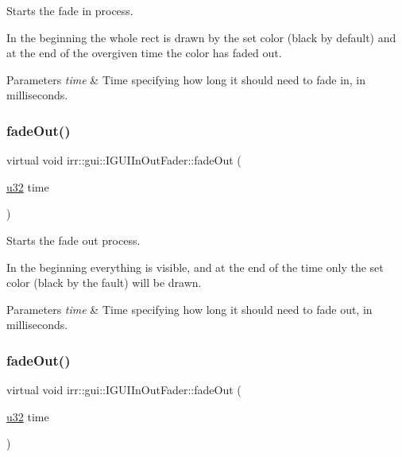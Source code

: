 Starts the fade in process. 

In the beginning the whole rect is drawn by the set color (black by default) and at the end of the overgiven time the color has faded out. 
\begin{DoxyParams}{Parameters}
{\em time} & Time specifying how long it should need to fade in, in milliseconds. \\
\hline
\end{DoxyParams}
\mbox{\label{classirr_1_1gui_1_1IGUIInOutFader_a5006c28699050d73be11b15ffc7ba993}} 
\subsubsection{\texorpdfstring{fade\+Out()}{fadeOut()}\hspace{0.1cm}{\footnotesize\ttfamily [1/2]}}
{\footnotesize\ttfamily virtual void irr\+::gui\+::\+I\+G\+U\+I\+In\+Out\+Fader\+::fade\+Out (\begin{DoxyParamCaption}\item[{\hyperlink{namespaceirr_a0416a53257075833e7002efd0a18e804}{u32}}]{time }\end{DoxyParamCaption})\hspace{0.3cm}{\ttfamily [pure virtual]}}



Starts the fade out process. 

In the beginning everything is visible, and at the end of the time only the set color (black by the fault) will be drawn. 
\begin{DoxyParams}{Parameters}
{\em time} & Time specifying how long it should need to fade out, in milliseconds. \\
\hline
\end{DoxyParams}
\mbox{\label{classirr_1_1gui_1_1IGUIInOutFader_a5006c28699050d73be11b15ffc7ba993}} 
\subsubsection{\texorpdfstring{fade\+Out()}{fadeOut()}\hspace{0.1cm}{\footnotesize\ttfamily [2/2]}}
{\footnotesize\ttfamily virtual void irr\+::gui\+::\+I\+G\+U\+I\+In\+Out\+Fader\+::fade\+Out (\begin{DoxyParamCaption}\item[{\hyperlink{namespaceirr_a0416a53257075833e7002efd0a18e804}{u32}}]{time }\end{DoxyParamCaption})\hspace{0.3cm}{\ttfamily [pure virtual]}}



